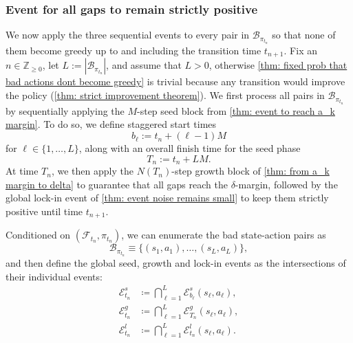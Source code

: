 

\subsubsection{Event for all gaps to remain strictly positive}

We now apply the three sequential events to every pair in $\mathcal B_{\pi_{t_n}}$ so that none of them become greedy up to and including the transition time $t_{n+1}$.
Fix an $n \in \mathbb Z_{\ge 0}$,
let $L := |\mathcal B_{\pi_{t_n}}|$,
and assume that $L>0$, otherwise \autoref{thm: fixed prob that bad actions dont become greedy} is trivial because any transition would improve the policy (\autoref{thm: strict improvement theorem}).
We first process all pairs in $\mathcal B_{\pi_{t_n}}$ by sequentially applying the $M$-step seed block from \autoref{thm: event to reach a_k margin}.
To do so, we define staggered start times
\[
b_\ell := t_n + (\ell-1) M
\]
for $\ell \in \{1, \dots, L\}$,
along with an overall finish time for the seed phase
\[
T_n := t_n + L M.
\]
At time $T_n$, we then apply the $N(T_n)$-step growth block 
of \autoref{thm: from a_k margin to delta} 
to guarantee that all gaps reach the $\delta$-margin,
followed by the global lock-in event
of \autoref{thm: event noise remains small} 
to keep them strictly positive until time $t_{n+1}$.


Conditioned on $(\mathcal F_{t_n}, \pi_{t_n})$, we can enumerate the bad state-action pairs as
\[
\mathcal B_{\pi_{t_n}} \equiv \big\{ (s_1,a_1), \dots, (s_L,a_L) \big\} ,
\]
and then define the global seed, growth and lock-in events as the intersections of their individual events:
\begin{align}
\label{eq: def global seed event}
\mathcal E^s_{t_n} &\coloneqq \bigcap_{\ell=1}^{L} \mathcal E^s_{b_\ell}(s_\ell, a_\ell) ,
\\
\label{eq: def global grow event}
\mathcal E^g_{t_n} &\coloneqq \bigcap_{\ell=1}^{L} \mathcal E^g_{T_n}(s_\ell, a_\ell) ,
\\
\label{eq: def global hold event}
\mathcal E^l_{t_n} &\coloneqq \bigcap_{\ell=1}^{L} \mathcal E^l_{t_n}(s_\ell, a_\ell) .
\end{align}


